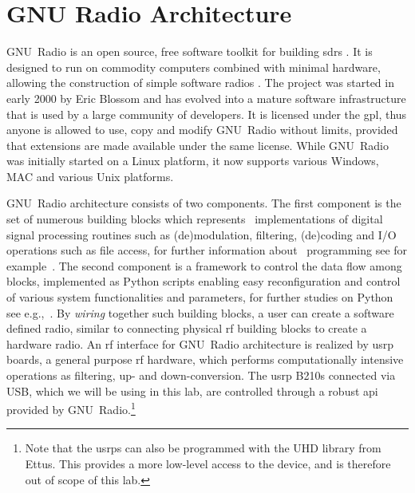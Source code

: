 \section{GNU Radio Architecture}\label{sec:gnur}

GNU~Radio is an open source, free software toolkit for building \glspl{sdr} \cite{GNUR}. It is designed to run on commodity computers combined with minimal hardware, allowing the construction of simple software radios \cite{DABETH}. The project was started in early 2000 by Eric Blossom and has evolved into a mature software infrastructure that is used by a large community of developers. It is licensed under the \gls{gpl}, thus anyone is allowed to use, copy and modify GNU~Radio without limits, provided that extensions are made available under the same license. While GNU~Radio was initially started on a Linux platform, it now supports various Windows, MAC and various Unix platforms.

GNU~Radio architecture consists of two components. The first component is the set of numerous building blocks which represents \Cpp\ implementations of digital signal processing routines such as (de)modulation, filtering, (de)coding and I/O operations such as file access, for further information about \Cpp\ programming see for example~\cite{Meyers,Meyers2,Meyers3,Stroustrup,Sutter}. The second component is a framework to control the data flow among blocks, implemented as Python scripts enabling easy reconfiguration and control of various system functionalities and parameters, for further studies on Python see e.g.,~\cite{Martelli}. By \textit{wiring} together such building blocks, a user can create a software defined radio, similar to connecting physical \gls{rf} building blocks to create a hardware radio. An \gls{rf} interface for GNU~Radio architecture is realized by \gls{usrp} boards, a general purpose \gls{rf} hardware, which performs computationally intensive operations as filtering, up- and down-conversion. The \gls{usrp} B210s connected via USB, which we will be using in this lab, are controlled through a robust \gls{api} provided by GNU~Radio.\footnote{Note that the \glspl{usrp} can also be programmed with the UHD library from Ettus. This provides a more low-level access to the device, and is therefore out of scope of this lab.}
